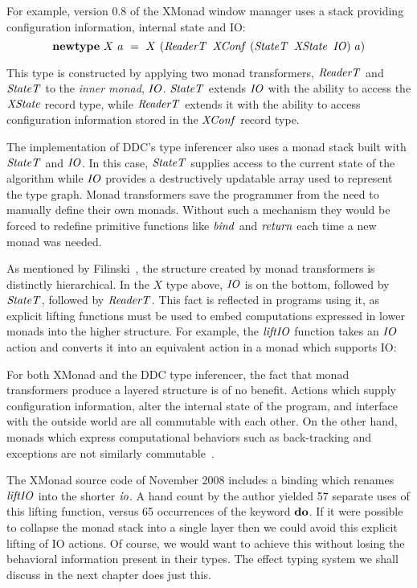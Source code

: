 \clearpage{}
For example, version 0.8 of the XMonad window manager uses a stack providing configuration information, internal state and IO:
$$
\textrm{\textbf{newtype}} \ X \ a \ = \ X \ (\operatorname{\mathit{ReaderT}} \ \operatorname{\mathit{XConf}} \ (\operatorname{\mathit{StateT}} \ \operatorname{\mathit{XState}} \ \operatorname{\mathit{IO}}) \ a)
$$

This type is constructed by applying two monad transformers, $\operatorname{\mathit{ReaderT}}$ and $\operatorname{\mathit{StateT}}$ to the \emph{inner monad}, $\operatorname{\mathit{IO}}$. $\operatorname{\mathit{StateT}}$ extends $\operatorname{\mathit{IO}}$ with the ability to access the $\operatorname{\mathit{XState}}$ record type, while $\operatorname{\mathit{ReaderT}}$ extends it with the ability to access configuration information stored in the $\operatorname{\mathit{XConf}}$ record type.

The implementation of DDC's type inferencer also uses a monad stack built with $\operatorname{\mathit{StateT}}$ and $\operatorname{\mathit{IO}}$. In this case, $\operatorname{\mathit{StateT}}$ supplies access to the current state of the algorithm while $\operatorname{\mathit{IO}}$ provides a destructively updatable array used to represent the type graph. Monad transformers save the programmer from the need to manually define their own monads. Without such a mechanism they would be forced to redefine primitive functions like $\operatorname{\mathit{bind}}$ and $\operatorname{\mathit{return}}$ each time a new monad was needed. 

As mentioned by Filinski~\cite{filinski:representing-monads}, the structure created by monad transformers is distinctly hierarchical. In the $X$ type above, $\operatorname{\mathit{IO}}$ is on the bottom, followed by $\operatorname{\mathit{StateT}}$, followed by $\operatorname{\mathit{ReaderT}}$. This fact is reflected in programs using it, as explicit lifting functions must be used to embed computations expressed in lower monads into the higher structure. For example, the $\operatorname{\mathit{liftIO}}$ function takes an $\operatorname{\mathit{IO}}$ action and converts it into an equivalent action in a monad which supports IO:


For both XMonad and the DDC type inferencer, the fact that monad transformers produce a layered structure is of no benefit. Actions which supply configuration information, alter the internal state of the program, and interface with the outside world are all commutable with each other. On the other hand, monads which express computational behaviors such as back-tracking and exceptions are not similarly commutable~\cite{filinski:representing-monads}.

The XMonad source code of November 2008 includes a binding which renames $\operatorname{\mathit{liftIO}}$ into the shorter $\operatorname{\mathit{io}}$. A hand count by the author yielded 57 separate uses of this lifting function, versus 65 occurrences of the keyword $\textrm{\textbf{do}}$. If it were possible to collapse the monad stack into a single layer then we could avoid this explicit lifting of IO actions. Of course, we would want to achieve this without losing the behavioral information present in their types. The effect typing system we shall discuss in the next chapter does just this. 

